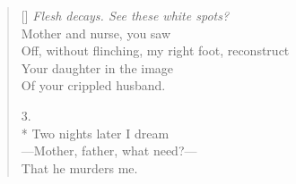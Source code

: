 \begin{verse}[\versewidth]
\textit{Flesh decays. See these white spots?}\\
Mother and nurse, you saw\\
Off, without flinching, my right foot, reconstruct\\
Your daughter in the image\\
Of your crippled husband.

3.\\*
Two nights later I dream\\
---Mother, father, what need?---\\
That he murders me.
\end{verse}
